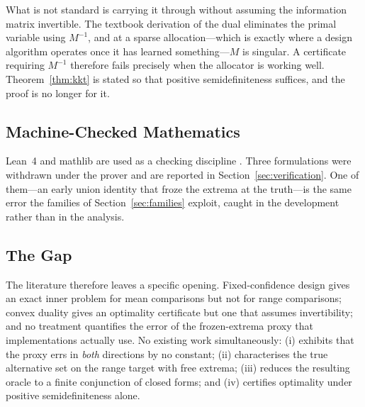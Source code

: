 What is not standard is carrying it through without assuming the information matrix
invertible. The textbook derivation of the dual eliminates the primal variable using
$M^{-1}$, and at a sparse allocation---which is exactly where a design algorithm operates
once it has learned something---$M$ is singular. A certificate requiring $M^{-1}$ therefore
fails precisely when the allocator is working well. Theorem~\ref{thm:kkt} is stated so that
positive semidefiniteness suffices, and the proof is no longer for it.

\subsection{Machine-Checked Mathematics}

Lean~4 and mathlib are used as a checking discipline \cite{demoura2021,mathlib2020}. Three
formulations were withdrawn under the prover and are reported in
Section~\ref{sec:verification}. One of them---an early union identity that froze the extrema
at the truth---is the same error the families of Section~\ref{sec:families} exploit, caught
in the development rather than in the analysis.

\subsection{The Gap}

The literature therefore leaves a specific opening. Fixed-confidence design gives an exact
inner problem for mean comparisons but not for range comparisons; convex duality gives an
optimality certificate but one that assumes invertibility; and no treatment quantifies the
error of the frozen-extrema proxy that implementations actually use. No existing work
simultaneously: (i) exhibits that the proxy errs in \emph{both} directions by no constant;
(ii) characterises the true alternative set on the range target with free extrema;
(iii) reduces the resulting oracle to a finite conjunction of closed forms; and
(iv) certifies optimality under positive semidefiniteness alone.

